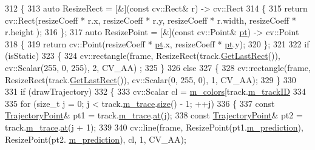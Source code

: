 \begin{DoxyCode}
312 \{
313     \textcolor{keyword}{auto} ResizeRect = [&](\textcolor{keyword}{const} cv::Rect& r) -> cv::Rect
314     \{
315         \textcolor{keywordflow}{return} cv::Rect(resizeCoeff * r.x, resizeCoeff * r.y, resizeCoeff * r.width, resizeCoeff * r.height
      );
316     \};
317     \textcolor{keyword}{auto} ResizePoint = [&](\textcolor{keyword}{const} cv::Point& \mbox{\hyperlink{rings_8cpp_af69bbacaaf68a115b351c5d1e29c3cc8}{pt}}) -> cv::Point
318     \{
319         \textcolor{keywordflow}{return} cv::Point(resizeCoeff * \mbox{\hyperlink{rings_8cpp_af69bbacaaf68a115b351c5d1e29c3cc8}{pt}}.x, resizeCoeff * \mbox{\hyperlink{rings_8cpp_af69bbacaaf68a115b351c5d1e29c3cc8}{pt}}.y);
320     \};
321 
322     \textcolor{keywordflow}{if} (isStatic)
323     \{
324         cv::rectangle(frame, ResizeRect(track.\mbox{\hyperlink{class_c_track_abe6c22779a5d7f0403980f4b4c647ade}{GetLastRect}}()), cv::Scalar(255, 0, 255), 2, CV\_AA)
      ;
325     \}
326     \textcolor{keywordflow}{else}
327     \{
328         cv::rectangle(frame, ResizeRect(track.\mbox{\hyperlink{class_c_track_abe6c22779a5d7f0403980f4b4c647ade}{GetLastRect}}()), cv::Scalar(0, 255, 0), 1, CV\_AA);
329     \}
330 
331     \textcolor{keywordflow}{if} (drawTrajectory)
332     \{
333         cv::Scalar cl = \mbox{\hyperlink{class_video_example_a2b6d4a6e85d52d13d8899c57cc6ddc66}{m\_colors}}[track.\mbox{\hyperlink{class_c_track_a8aae01d68f5a1a6c0292476ea19c89f9}{m\_trackID}} %
334 
335         \textcolor{keywordflow}{for} (\textcolor{keywordtype}{size\_t} j = 0; j < track.\mbox{\hyperlink{class_c_track_adf88ff8678ec928ac3ca764f7308b96f}{m\_trace}}.\mbox{\hyperlink{class_trace_a1bc7111ffb39ba415c2553677fc2f3ba}{size}}() - 1; ++j)
336         \{
337             \textcolor{keyword}{const} \mbox{\hyperlink{struct_trajectory_point}{TrajectoryPoint}}& pt1 = track.\mbox{\hyperlink{class_c_track_adf88ff8678ec928ac3ca764f7308b96f}{m\_trace}}.\mbox{\hyperlink{class_trace_a275e31cde73ea1ba7f51c17191aefcd5}{at}}(j);
338             \textcolor{keyword}{const} \mbox{\hyperlink{struct_trajectory_point}{TrajectoryPoint}}& pt2 = track.\mbox{\hyperlink{class_c_track_adf88ff8678ec928ac3ca764f7308b96f}{m\_trace}}.\mbox{\hyperlink{class_trace_a275e31cde73ea1ba7f51c17191aefcd5}{at}}(j + 1);
339 
340             cv::line(frame, ResizePoint(pt1.\mbox{\hyperlink{struct_trajectory_point_a967909b451c226e4927a2b96fcecbb6e}{m\_prediction}}), ResizePoint(pt2.
      \mbox{\hyperlink{struct_trajectory_point_a967909b451c226e4927a2b96fcecbb6e}{m\_prediction}}), cl, 1, CV\_AA);

\end{DoxyCode}
